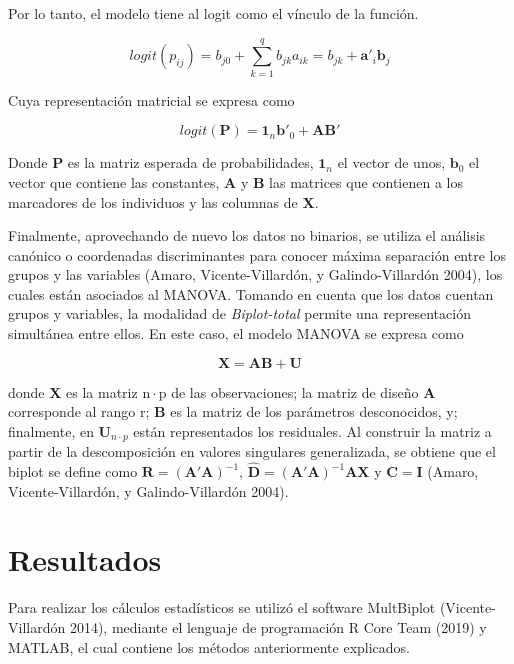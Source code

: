 \documentclass[
  10pt,
  spanish,
]{article}
\begin{document}
Por lo tanto, el modelo tiene al logit como el vínculo de la función.

\begin{equation}
logit(p_{ij}) = b_{j0}+ \sum_{k=1}^{q}b_{jk}a_{ik} = b_{jk}+\mathbf{a'}_i\mathbf{b}_j
\end{equation}

Cuya representación matricial se expresa como

\begin{equation}
logit(\mathbf{P}) = \mathbf{1}_n \mathbf{b'}_0 + \mathbf{AB'}
\end{equation}

Donde \(\mathbf{P}\) es la matriz esperada de probabilidades,
\(\mathbf{1}_n\) el vector de unos, \(\mathbf{b}_0\) el vector que
contiene las constantes, \(\mathbf{A}\) y \(\mathbf{B}\) las matrices
que contienen a los marcadores de los individuos y las columnas de
\(\mathbf{X}\).

Finalmente, aprovechando de nuevo los datos no binarios, se utiliza el
análisis canónico o coordenadas discriminantes para conocer máxima
separación entre los grupos y las variables (Amaro, Vicente-Villardón, y
Galindo-Villardón 2004), los cuales están asociados al MANOVA. Tomando
en cuenta que los datos cuentan grupos y variables, la modalidad de
\emph{Biplot-total} permite una representación simultánea entre ellos.
En este caso, el modelo MANOVA se expresa como

\begin{equation}
\mathbf{X} = \mathbf{AB} + \mathbf{U}
\end{equation}

donde \(\mathbf{X}\) es la matriz \(\mathrm{n · p}\) de las
observaciones; la matriz de diseño \(\mathbf{A}\) corresponde al rango
r; \(\mathbf{B}\) es la matriz de los parámetros desconocidos, y;
finalmente, en \(\mathbf{U}_{n · p}\) están representados los
residuales. Al construir la matriz a partir de la descomposición en
valores singulares generalizada, se obtiene que el biplot se define como
\(\mathbf{R} = (\mathbf{A'}\mathbf{A})^{-1}\),
\(\mathbf{\hat{D}} = (\mathbf{A'}\mathbf{A})^{-1}\mathbf{A}\mathbf{X}\)
y \(\mathbf{C} = \mathbf{I}\) (Amaro, Vicente-Villardón, y
Galindo-Villardón 2004).

\hypertarget{resultados}{%
\section{Resultados}\label{resultados}}

Para realizar los cálculos estadísticos se utilizó el software
MultBiplot (Vicente-Villardón 2014), mediante el lenguaje de
programación R Core Team (2019) y MATLAB, el cual contiene los métodos
anteriormente explicados.
\end{document}
